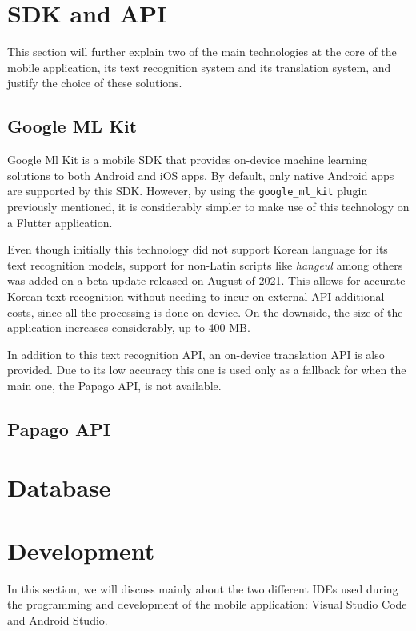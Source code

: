 \section{SDK and API}

This section will further explain two of the main technologies at the core of the mobile application, its text recognition system and its translation system, and justify the choice of these solutions.

\subsection{Google ML Kit}

Google Ml Kit \cite{noauthor_ml_nodate} is a mobile SDK that provides on-device machine learning solutions to both Android and iOS apps. By default, only native Android apps are supported by this SDK. However, by using the \texttt{google\_ml\_kit} plugin previously mentioned, it is considerably simpler to make use of this technology on a Flutter application.

Even though initially this technology did not support Korean language for its text recognition models, support for non-Latin scripts like \textit{hangeul} among others was added on a beta update released on August of 2021. This allows for accurate Korean text recognition without needing to incur on external API additional costs, since all the processing is done on-device. On the downside, the size of the application increases considerably, up to 400 MB.

In addition to this text recognition API, an on-device translation API is also provided. Due to its low accuracy this one is used only as a fallback for when the main one, the Papago API, is not available.

\subsection{Papago API}

\section{Database}

\section{Development}

In this section, we will discuss mainly about the two different IDEs used during the programming and development of the mobile application: Visual Studio Code and Android Studio.

